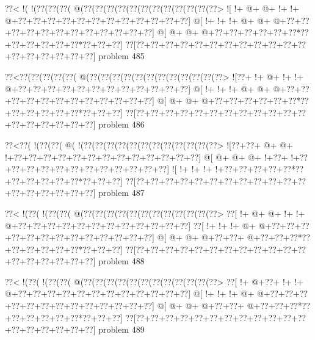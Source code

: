 \vbox{\vbox{\goo
\0??<\- !(\- !(\0??(\0??(\0??(\- @(\0??(\0??(\0??(\0??(\0??(\0??(\0??(\0??(\0??(\0??(\0??(\0??>
\- ![\- !+\- @+\- @+\- !+\- !+\- @+\0??+\0??+\0??+\0??+\0??+\0??+\0??+\0??+\0??+\0??+\0??+\0??]
\- @[\- !+\- !+\- !+\- @+\- @+\- @+\0??+\0??+\0??+\0??+\0??+\0??+\0??+\0??+\0??+\0??+\0??+\0??]
\- @[\- @+\- @+\- @+\0??+\0??+\0??+\0??+\0??+\0??*\0??+\0??+\0??+\0??+\0??+\0??*\0??+\0??+\0??]
\0??[\0??+\0??+\0??+\0??+\0??+\0??+\0??+\0??+\0??+\0??+\0??+\0??+\0??+\0??+\0??+\0??+\0??+\0??]
}
\hfil problem 485\hfil\break
}



\vbox{\vbox{\goo
\0??<\0??(\0??(\0??(\0??(\0??(\- @(\0??(\0??(\0??(\0??(\0??(\0??(\0??(\0??(\0??(\0??(\0??(\0??>
\- ![\0??+\- !+\- @+\- !+\- !+\- @+\0??+\0??+\0??+\0??+\0??+\0??+\0??+\0??+\0??+\0??+\0??+\0??]
\- @[\- !+\- !+\- !+\- @+\- @+\- @+\0??+\0??+\0??+\0??+\0??+\0??+\0??+\0??+\0??+\0??+\0??+\0??]
\- @[\- @+\- @+\- @+\0??+\0??+\0??+\0??+\0??+\0??*\0??+\0??+\0??+\0??+\0??+\0??*\0??+\0??+\0??]
\0??[\0??+\0??+\0??+\0??+\0??+\0??+\0??+\0??+\0??+\0??+\0??+\0??+\0??+\0??+\0??+\0??+\0??+\0??]
}
\hfil problem 486\hfil\break
}



\vbox{\vbox{\goo
\0??<\0??(\- !(\0??(\0??(\- @(\- !(\0??(\0??(\0??(\0??(\0??(\0??(\0??(\0??(\0??(\0??(\0??(\0??>
\- ![\0??+\0??+\- @+\- @+\- !+\0??+\0??+\0??+\0??+\0??+\0??+\0??+\0??+\0??+\0??+\0??+\0??+\0??]
\- @[\- @+\- @+\- @+\- !+\0??+\- !+\0??+\0??+\0??+\0??+\0??+\0??+\0??+\0??+\0??+\0??+\0??+\0??]
\- ![\- !+\- !+\- !+\- !+\0??+\0??+\0??+\0??+\0??*\0??+\0??+\0??+\0??+\0??+\0??*\0??+\0??+\0??]
\0??[\0??+\0??+\0??+\0??+\0??+\0??+\0??+\0??+\0??+\0??+\0??+\0??+\0??+\0??+\0??+\0??+\0??+\0??]
}
\hfil problem 487\hfil\break
}



\vbox{\vbox{\goo
\0??<\- !(\0??(\- !(\0??(\0??(\- @(\0??(\0??(\0??(\0??(\0??(\0??(\0??(\0??(\0??(\0??(\0??(\0??>
\0??[\- !+\- @+\- @+\- !+\- !+\- @+\0??+\0??+\0??+\0??+\0??+\0??+\0??+\0??+\0??+\0??+\0??+\0??]
\0??[\- !+\- !+\- !+\- @+\- @+\0??+\0??+\0??+\0??+\0??+\0??+\0??+\0??+\0??+\0??+\0??+\0??+\0??]
\- @[\- @+\- @+\- @+\0??+\0??+\- @+\0??+\0??+\0??*\0??+\0??+\0??+\0??+\0??+\0??*\0??+\0??+\0??]
\0??[\0??+\0??+\0??+\0??+\0??+\0??+\0??+\0??+\0??+\0??+\0??+\0??+\0??+\0??+\0??+\0??+\0??+\0??]
}
\hfil problem 488\hfil\break
}



\vbox{\vbox{\goo
\0??<\- !(\0??(\- !(\0??(\0??(\- @(\0??(\0??(\0??(\0??(\0??(\0??(\0??(\0??(\0??(\0??(\0??(\0??>
\0??[\- !+\- @+\0??+\- !+\- !+\- @+\0??+\0??+\0??+\0??+\0??+\0??+\0??+\0??+\0??+\0??+\0??+\0??]
\- @[\- !+\- !+\- !+\- @+\- @+\0??+\0??+\0??+\0??+\0??+\0??+\0??+\0??+\0??+\0??+\0??+\0??+\0??]
\- @[\- @+\- @+\- @+\0??+\0??+\- @+\0??+\0??+\0??*\0??+\0??+\0??+\0??+\0??+\0??*\0??+\0??+\0??]
\0??[\0??+\0??+\0??+\0??+\0??+\0??+\0??+\0??+\0??+\0??+\0??+\0??+\0??+\0??+\0??+\0??+\0??+\0??]
}
\hfil problem 489\hfil\break
}



